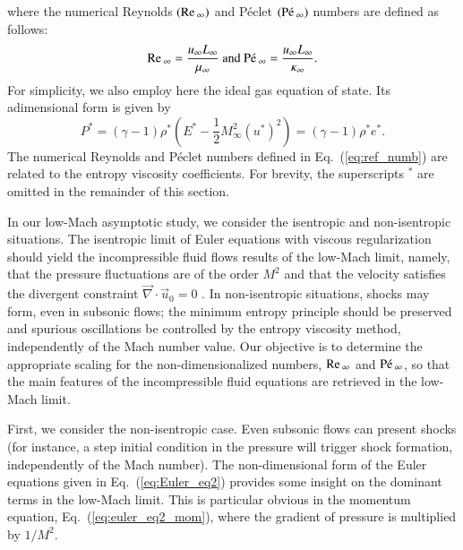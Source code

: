 \documentclass[preprint,10pt]{elsarticle}
\renewcommand{\div}{\vec{\nabla}\! \cdot \!}
\renewcommand{\Re}{\textrm{Re\,}}
\newcommand{\Pe}{\textrm{P\'e\,}}
\newcommand{\eqt}[1]{Eq.~(\ref{#1})}                     %
\begin{document}
where the numerical Reynolds $(\Re_\infty)$ and P\'eclet $(\Pe_\infty)$ numbers are defined as follows:
%
\begin{equation}
\label{eq:ref_numb}
\Re_\infty = \frac{u_\infty L_\infty}{\mu_\infty} \text{ and }
\Pe_\infty = \frac{u_\infty L_\infty}{\kappa_\infty} \text{.}
\end{equation}
%
For simplicity, we also employ here the ideal gas equation of state. Its adimensional form is given by
%
\begin{equation}
\label{eq:euler_eq2_eos}
P^* = \left( \gamma-1 \right) \rho^*\left(  E^* -\frac{1}{2} M_\infty^2 (u^*)^2 \right) = \left( \gamma-1 \right) \rho^* e^*.
\end{equation}
%
The numerical Reynolds and P\'eclet numbers defined in \eqt{eq:ref_numb} are related to the entropy viscosity coefficients. 
For brevity, the superscripts $^*$ are omitted in the remainder of this section. 

In our low-Mach asymptotic study, we consider the isentropic and non-isentropic situations. The isentropic limit of Euler equations with viscous regularization should yield the incompressible fluid flows results of the low-Mach limit, namely, that the pressure fluctuations are of the order $M^2$ and that the velocity satisfies the divergent constraint $\div \vec{u}_0 = 0$ \cite{LowMach1, LowMach2, LowMach3}. In non-isentropic situations, shocks may form, even in subsonic flows; the minimum entropy principle should be preserved and spurious oscillations be controlled by the entropy viscosity method, independently of the Mach number value.
Our objective is to determine the appropriate scaling for the non-dimensionalized numbers, $\Re_\infty$ and $\Pe_\infty$, so that the main features of the incompressible fluid equations are retrieved in the low-Mach limit.

First, we consider the non-isentropic case. Even subsonic flows can present shocks (for instance, a step initial condition in the pressure will trigger shock formation, independently of the Mach number). The non-dimensional form of the Euler equations given in \eqt{eq:Euler_eq2} provides some insight on the dominant terms in the low-Mach limit. This is particular obvious in the momentum equation, \eqt{eq:euler_eq2_mom}, where the gradient of pressure is multiplied by $1/M^2$. 
\end{document}
